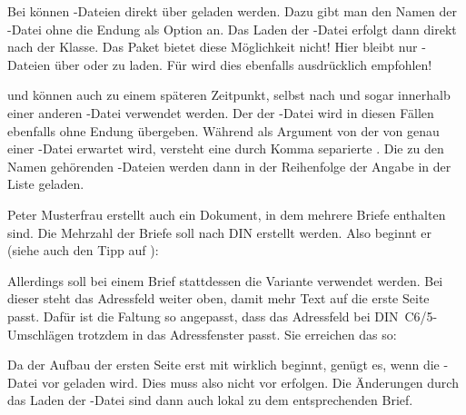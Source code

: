\begin{Declaration}
\end{Declaration}
Bei  können -Dateien direkt
über  geladen werden. Dazu gibt man den
Namen der -Datei ohne die Endung als Option an. Das
Laden der -Datei erfolgt dann direkt nach der Klasse. Das Paket
 bietet diese Möglichkeit nicht! Hier
bleibt nur -Dateien über 
oder  zu
laden. Für  wird dies ebenfalls
ausdrücklich empfohlen!

 und  können auch zu einem
späteren Zeitpunkt, selbst nach  und sogar
innerhalb einer anderen -Datei verwendet werden.  Der 
der -Datei wird in diesen Fällen ebenfalls ohne Endung
übergeben. Während als Argument von  der 
von genau einer -Datei erwartet wird, versteht
 eine durch Komma separierte . Die zu den Namen gehörenden -Dateien werden dann in der
Reihenfolge der Angabe in der Liste geladen.
\begin{Example}
  Peter Musterfrau erstellt auch ein Dokument, in dem mehrere Briefe enthalten
  sind. Die Mehrzahl der Briefe soll nach DIN erstellt werden. Also
  beginnt er (siehe auch den Tipp auf ):
  Allerdings soll bei einem Brief stattdessen die Variante
   verwendet werden. Bei dieser steht das Adressfeld
  weiter oben, damit mehr Text auf die erste Seite passt. Dafür ist
  die Faltung so angepasst, dass das Adressfeld bei
  DIN~C6/5-Umschlägen trotzdem in das Adressfenster passt. Sie
  erreichen das so:
  Da der Aufbau der ersten Seite erst mit
   wirklich beginnt, genügt
  es, wenn die -Datei vor  geladen
  wird. Dies muss also nicht vor 
  erfolgen. Die Änderungen durch das Laden der -Datei sind dann auch
  lokal zu dem entsprechenden Brief.
\end{Example}

